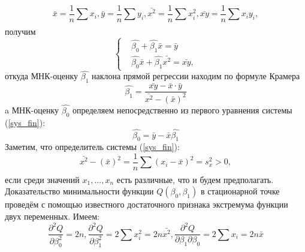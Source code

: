 \documentclass[a4paper]{article}
\begin{document}
            \begin{equation}
                \bar{x} = \frac{1}{n}\sum_{}{}{x_{i}}, \bar{y} = \frac{1}{n}\sum_{}{}{y_{i}}, \bar{x^{2}} = \frac{1}{n}\sum_{}{}{x_{i}^{2}}, \bar{xy} = \frac{1}{n}\sum_{}{}{x_{i}y_{i}},
            \end{equation}
            получим
                \begin{equation}
               \begin{cases}
                 & \hat{\beta_{0}} + \hat{\beta_{1}}\bar{x} =
                 \bar{y}\\
                & \hat{\beta_{0}}\bar{x} + \hat{\beta_{1}}\bar{x^{2}} = \bar{xy},
               \end{cases}
               \label{sys_fin}
            \end{equation}
            откуда МНК-оценку $\hat{\beta_1}$ наклона прямой регрессии находим по формуле Крамера
            \begin{equation}
                \hat{\beta_{1}} = \frac{\bar{xy} - \bar{x} \cdot \bar{y}}{\bar{x^{2}} - (\bar{x})^{2}}
                \label{beta_1_new}
            \end{equation}
            a МНК-оценку $\hat{\beta_0}$  определяем непосредственно из первого уравнения системы (\ref{sys_fin}):
            \begin{equation}
                \hat{\beta_{0}} = \bar{y} - \bar{x}\hat{\beta_{1}}
                \label{beta_0_new}
            \end{equation}
            Заметим, что определитель системы (\ref{sys_fin}):
            \begin{equation}
                \bar{x^{2}} - (\bar{x})^{2} = \frac{1}{n}\sum_{}{}{(x_{i} - \bar{x})^{2}} = s_{x}^{2} > 0,
            \end{equation}
            если среди значений $x_{1},...,x_{n}$ есть различные, что и будем предполагать.
            \newline
            Доказательство минимальности функции $Q(\beta_{0}, \beta_{1})$ в стационарной точке проведём с помощью известного достаточного признака экстремума функции двух переменных. Имеем:
            \begin{equation}
                \frac{\partial ^{2} Q}{\partial \beta_{0}^{2}} = 2n,
                \frac{\partial ^{2} Q}{\partial \beta_{1}^{2}} = 2\sum_{}{}{x_{i}^{2}} = 2n\bar{x^{2}},
                \frac{\partial ^{2} Q}{\partial \beta_{1} \partial \beta_{0}} = 2\sum_{}{}{x_{i}} = 2n\bar{x}
                \label{frac_eq}
            \end{equation}
\end{document}
